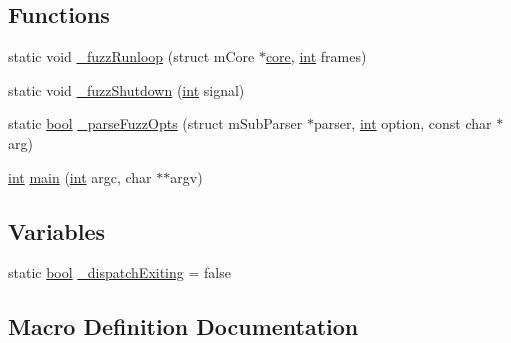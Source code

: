 \subsection*{Functions}
\begin{DoxyCompactItemize}
\item 
static void \mbox{\hyperlink{fuzz-main_8c_a2d0278ae741941374e0465b15af47d1d}{\+\_\+fuzz\+Runloop}} (struct m\+Core $\ast$\mbox{\hyperlink{libretro_8c_a0fa20029c1b76361c88b7c2b13e89aff}{core}}, \mbox{\hyperlink{ioapi_8h_a787fa3cf048117ba7123753c1e74fcd6}{int}} frames)
\item 
static void \mbox{\hyperlink{fuzz-main_8c_a4c46953207b5f03a88084e0d3918c9d1}{\+\_\+fuzz\+Shutdown}} (\mbox{\hyperlink{ioapi_8h_a787fa3cf048117ba7123753c1e74fcd6}{int}} signal)
\item 
static \mbox{\hyperlink{libretro_8h_a4a26dcae73fb7e1528214a068aca317e}{bool}} \mbox{\hyperlink{fuzz-main_8c_abe6668fd69b615464e23aff05af1b70b}{\+\_\+parse\+Fuzz\+Opts}} (struct m\+Sub\+Parser $\ast$parser, \mbox{\hyperlink{ioapi_8h_a787fa3cf048117ba7123753c1e74fcd6}{int}} option, const char $\ast$arg)
\item 
\mbox{\hyperlink{ioapi_8h_a787fa3cf048117ba7123753c1e74fcd6}{int}} \mbox{\hyperlink{fuzz-main_8c_a3c04138a5bfe5d72780bb7e82a18e627}{main}} (\mbox{\hyperlink{ioapi_8h_a787fa3cf048117ba7123753c1e74fcd6}{int}} argc, char $\ast$$\ast$argv)
\end{DoxyCompactItemize}
\subsection*{Variables}
\begin{DoxyCompactItemize}
\item 
static \mbox{\hyperlink{libretro_8h_a4a26dcae73fb7e1528214a068aca317e}{bool}} \mbox{\hyperlink{fuzz-main_8c_a8525f6cde5f9256308f54df6d5b5ba37}{\+\_\+dispatch\+Exiting}} = false
\end{DoxyCompactItemize}


\subsection{Macro Definition Documentation}
\mbox{\label{fuzz-main_8c_a1ba1c6c17fafca1710418ac9abfd7994}} 
